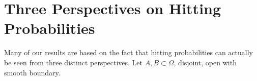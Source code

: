 \documentclass[nofootinbib,english, aip, jcp, priprint, graphicx,floatfix]{revtex4-1}
\theoremstyle{plain}
\theoremstyle{definition}
\theoremstyle{plain}
\begin{document}
\newpage
\appendix
{}


                                                         
\section{Three Perspectives on Hitting Probabilities}
\label{sec:three_perspectives}

Many of our results are based on the fact that hitting probabilities can actually be seen from three distinct perspectives.  Let $A,B\subset \Omega$, disjoint, open with smooth boundary.  
\end{document}
